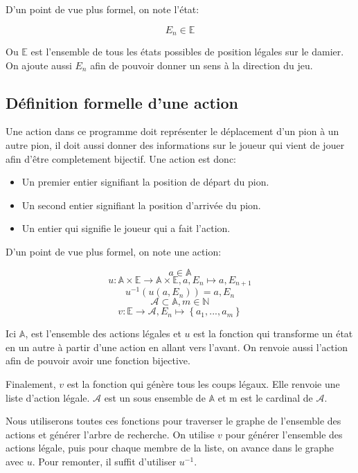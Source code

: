 \documentclass[a4paper,11pt]{article}
\begin{document}
\begin{multicols}{2}[]
    D'un point de vue plus formel, on note l'état: 

    \[ E_{n} \in \mathbb{E} \]

    Ou $\mathbb{E}$ est l'ensemble de tous les états possibles de position
    légales sur le damier. On ajoute aussi $E_{n}$ afin de pouvoir donner un
    sens à la direction du jeu.

  \subsection{Définition formelle d'une action}

    Une action dans ce programme doit représenter le déplacement d'un pion à un
    autre pion, il doit aussi donner des informations sur le joueur qui vient de
    jouer afin d'être completement bijectif. Une action est donc:

    \begin{itemize}
      \item Un premier entier signifiant la position de départ du pion.
      \item Un second entier signifiant la position d'arrivée du pion.
      \item Un entier qui signifie le joueur qui a fait l'action.
    \end{itemize}

    D'un point de vue plus formel, on note une action:

    \[  a \in \mathbb{A} \]
    \[ u : \mathbb{A} \times \mathbb{E} \to \mathbb{A} \times \mathbb{E}, 
        a, E_{n} \mapsto a, E_{n+1} \]
    \[ u^{-1}(u(a, E_{n})) = a, E_{n} \]
    \[ \mathcal{A} \subset \mathbb{A}, m \in \mathbb{N} \]
    \[ v : \mathbb{E} \to \mathcal{A},
        E_{n} \mapsto \left\{ a_{1}, ..., a_{m} \right\} \]

    Ici $\mathbb{A}$, est l'ensemble des actions légales et $u$ est la fonction
    qui transforme un état en un autre à partir d'une action en allant vers
    l'avant. On renvoie aussi l'action afin de pouvoir avoir une fonction
    bijective.

    Finalement, $v$ est la fonction qui génère tous les coups légaux. Elle
    renvoie une liste d'action légale. $\mathcal{A}$ est un sous ensemble de 
    $\mathbb{A}$ et m est le cardinal de $\mathcal{A}$.
    
    Nous utiliserons toutes ces fonctions pour traverser le graphe de l'ensemble
    des actions et générer l'arbre de recherche. On utilise $v$ pour générer
    l'ensemble des actions légale, puis pour chaque membre de la liste, on
    avance dans le graphe avec $u$. Pour remonter, il suffit d'utiliser
    $u^{-1}$.


\end{multicols}
\end{document}
